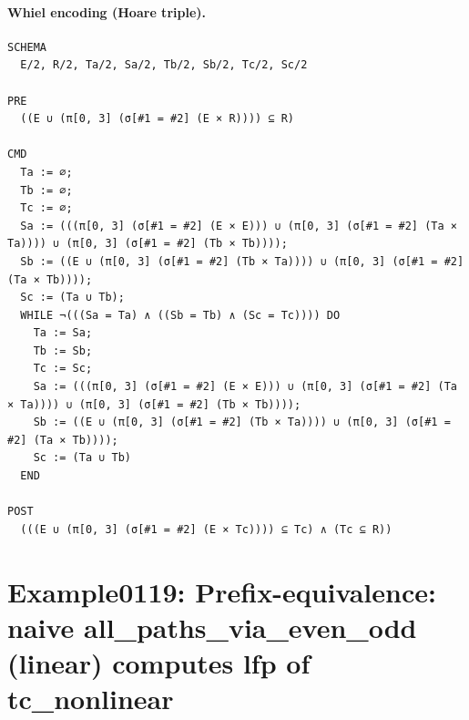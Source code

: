 \documentclass[10pt]{article}
\begin{document}
\paragraph{Whiel encoding (Hoare triple).}

\begin{Verbatim}[fontsize=\scriptsize,breaklines=true,breakanywhere=true,frame=single,framesep=1.5mm]
SCHEMA
  E/2, R/2, Ta/2, Sa/2, Tb/2, Sb/2, Tc/2, Sc/2

PRE
  ((E ∪ (π[0, 3] (σ[#1 = #2] (E × R)))) ⊆ R)

CMD
  Ta := ∅;
  Tb := ∅;
  Tc := ∅;
  Sa := (((π[0, 3] (σ[#1 = #2] (E × E))) ∪ (π[0, 3] (σ[#1 = #2] (Ta × Ta)))) ∪ (π[0, 3] (σ[#1 = #2] (Tb × Tb))));
  Sb := ((E ∪ (π[0, 3] (σ[#1 = #2] (Tb × Ta)))) ∪ (π[0, 3] (σ[#1 = #2] (Ta × Tb))));
  Sc := (Ta ∪ Tb);
  WHILE ¬(((Sa = Ta) ∧ ((Sb = Tb) ∧ (Sc = Tc)))) DO
    Ta := Sa;
    Tb := Sb;
    Tc := Sc;
    Sa := (((π[0, 3] (σ[#1 = #2] (E × E))) ∪ (π[0, 3] (σ[#1 = #2] (Ta × Ta)))) ∪ (π[0, 3] (σ[#1 = #2] (Tb × Tb))));
    Sb := ((E ∪ (π[0, 3] (σ[#1 = #2] (Tb × Ta)))) ∪ (π[0, 3] (σ[#1 = #2] (Ta × Tb))));
    Sc := (Ta ∪ Tb)
  END

POST
  (((E ∪ (π[0, 3] (σ[#1 = #2] (E × Tc)))) ⊆ Tc) ∧ (Tc ⊆ R))
\end{Verbatim}

\Needspace{0.45\textheight}

\section{Example0119: Prefix-equivalence: naive all\_paths\_via\_even\_odd (linear) computes lfp of tc\_nonlinear}\label{case:Example0119}
\end{document}
